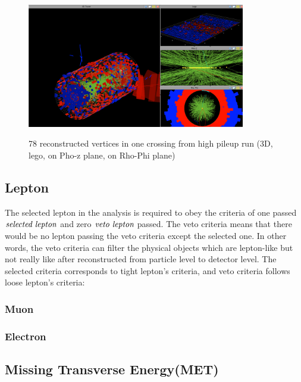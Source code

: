 		\begin{figure}[H]
		\centering{}
	    	\includegraphics[width=0.85\textwidth]{Figures/PhysObj/pileup_image.png}\\
		\caption{78 reconstructed vertices in one crossing from high pileup run (3D, lego, on Pho-z plane, on Rho-Phi plane) \cite{Pileup_page}}
		\label{PhysObj:fig:pileup_img}
		\end{figure}
		\FloatBarrier



	\subsection{Lepton}
	\label{ssec:PhysObj_lep}

		The selected lepton in the analysis is required to obey the criteria of one passed $\emph{selected lepton}$ and zero $\emph{veto lepton}$ passed. The veto criteria means that there would be no lepton passing the veto criteria except the selected one. In other words, the veto criteria can filter the physical objects which are lepton-like but not really like after reconstructed from particle level to detector level. The selected criteria corresponds to tight lepton's criteria, and veto criteria follows loose lepton's criteria:

		\subsubsection{Muon}
		\label{sssec:Muon}
			

		\subsubsection{Electron}
		\label{sssec:Electron}


	\subsection{Missing Transverse Energy(MET)}
	\label{ssec:PhysObj_met}


